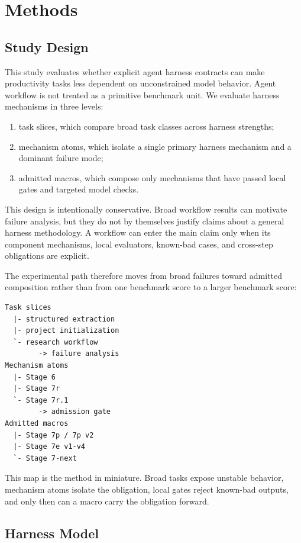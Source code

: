 \documentclass[11pt]{article}
\begin{document}
\section{Methods}

\subsection{Study Design}

This study evaluates whether explicit agent harness contracts can make productivity tasks less dependent on unconstrained model behavior. Agent workflow is not treated as a primitive benchmark unit. We evaluate harness mechanisms in three levels:

\begin{enumerate}
\item task slices, which compare broad task classes across harness strengths;
\item mechanism atoms, which isolate a single primary harness mechanism and a dominant failure mode;
\item admitted macros, which compose only mechanisms that have passed local gates and targeted model checks.
\end{enumerate}

This design is intentionally conservative. Broad workflow results can motivate failure analysis, but they do not by themselves justify claims about a general harness methodology. A workflow can enter the main claim only when its component mechanisms, local evaluators, known-bad cases, and cross-step obligations are explicit.

The experimental path therefore moves from broad failures toward admitted composition rather than from one benchmark score to a larger benchmark score:

\begin{verbatim}
Task slices
  |- structured extraction
  |- project initialization
  `- research workflow
        -> failure analysis
Mechanism atoms
  |- Stage 6
  |- Stage 7r
  `- Stage 7r.1
        -> admission gate
Admitted macros
  |- Stage 7p / 7p v2
  |- Stage 7e v1-v4
  `- Stage 7-next
\end{verbatim}

This map is the method in miniature. Broad tasks expose unstable behavior, mechanism atoms isolate the obligation, local gates reject known-bad outputs, and only then can a macro carry the obligation forward.

\subsection{Harness Model}
\end{document}
